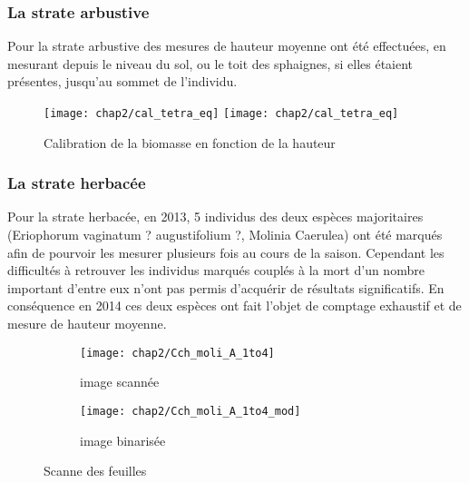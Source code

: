 \subsubsection{La strate arbustive}
Pour la strate arbustive des mesures de hauteur moyenne ont été effectuées, en mesurant depuis le niveau du sol, ou le toit des sphaignes, si elles étaient présentes, jusqu'au sommet de l'individu.
\begin{figure}
\texttt{[image: chap2/cal\_tetra\_eq]}
\texttt{[image: chap2/cal\_tetra\_eq]}
\caption{Calibration de la biomasse en fonction de la hauteur}
\label{fig:cal_arbu}
\end{figure}

\subsubsection{La strate herbacée}
Pour la strate herbacée, en 2013, 5 individus des deux espèces majoritaires (Eriophorum vaginatum ? augustifolium ?, Molinia Caerulea) ont été marqués afin de pourvoir les mesurer plusieurs fois au cours de la saison.
Cependant les difficultés à retrouver les individus marqués couplés à la mort d'un nombre important d'entre eux n'ont pas permis d'acquérir de résultats significatifs.
En conséquence en 2014 ces deux espèces ont fait l'objet de comptage exhaustif et de mesure de hauteur moyenne.


\begin{figure}
	\centering
	\begin{subfigure}[t]{0.5\textwidth}
		\centering
		\texttt{[image: chap2/Cch\_moli\_A\_1to4]}
		\caption{image scannée}
	\end{subfigure}%
	\begin{subfigure}[t]{0.5\textwidth}
		\centering
		\texttt{[image: chap2/Cch\_moli\_A\_1to4\_mod]}
		\caption{image binarisée}
	\end{subfigure}
\caption{Scanne des feuilles}
\label{fig:scan_mol}
\end{figure}


